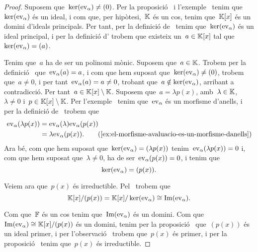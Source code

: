 \documentclass[../teoria-de-Galois.tex]{subfiles}
\begin{document}
    \begin{proof} %
        Suposem que~\(\operatorname{ker}(\mathrm{ev}_{\alpha})\neq(0)\).
        Per la proposició~ i l'exemple~ tenim que~\(\operatorname{ker}(\mathrm{ev}_{\alpha})\) és un ideal, i com que, per hipòtesi,~\(\mathbb{K}\) és un cos, tenim que~\(\mathbb{K}[x]\) és un domini d'ideals principals.
        Per tant, per la definició de~ tenim que~\(\operatorname{ker}(\mathrm{ev}_{\alpha})\) és un ideal principal, i per la definició d' trobem que existeix un~\(a\in\mathbb{K}[x]\) tal que~\(\operatorname{ker}(\mathrm{ev}_{\alpha})=(a)\).

        Tenim que~\(a\) ha de ser un polinomi mònic.
        Suposem que~\(a\in\mathbb{K}\).
        Trobem per la definició~ que~\(\mathrm{ev}_{\alpha}(a)=a\), i com que hem suposat que~\(\operatorname{ker}(\mathrm{ev}_{\alpha})\neq(0)\), trobem que~\(a\neq0\), i per tant~\(\mathrm{ev}_{\alpha}(a)=a\neq0\), trobant que~\(a\notin\operatorname{ker}(\mathrm{ev}_{\alpha})\), arribant a contradicció.
        Per tant~\(a\in\mathbb{K}[x]\setminus\mathbb{K}\).
        Suposem que~\(a=\lambda p(x)\), amb~\(\lambda\in\mathbb{K}\),~\(\lambda\neq0\) i~\(p\in\mathbb{K}[x]\setminus\mathbb{K}\).
        Per l'exemple~ tenim que~\(\mathrm{ev}_{\alpha}\) és un morfisme d'anells, i per la definició de~ trobem que
        \begin{align*}
            \ev_{\alpha}(\lambda p(x))&=\ev_{\alpha}(\lambda)\ev_{\alpha}(p(x))\\
            &=\lambda\ev_{\alpha}(p(x)).
            \tag{\ref{ex:el-morfisme-avaluacio-es-un-morfisme-danells}}
        \end{align*}
        Ara bé, com que hem suposat que~\(\operatorname{ker}(\mathrm{ev}_{\alpha})=(\lambda p(x))\) tenim~\(\mathrm{ev}_{\alpha}(\lambda p(x))=0\) i, com que hem suposat que~\(\lambda\neq0\), ha de ser~\(\mathrm{ev}_{\alpha}(p(x))=0\), i tenim que
        \[
            \operatorname{ker}(\mathrm{ev}_{\alpha})=(p(x)).
        \]

        Veiem ara que~\(p(x)\) és irreductible.
        Pel~ trobem que
        \[
            \mathbb{K}[x]/(p(x))=\mathbb{K}[x]/\operatorname{ker}(\mathrm{ev}_{\alpha})\cong\operatorname{Im}(\mathrm{ev}_{\alpha}).
        \]

        Com que~\(\mathbb{F}\) és un cos tenim que~\(\operatorname{Im}(\mathrm{ev}_{\alpha})\) és un domini.
        Com que~\(\operatorname{Im}(\mathrm{ev}_{\alpha})\cong\mathbb{K}[x]/(p(x))\) és un domini, tenim per la proposició~ que~\((p(x))\) és un ideal primer, i per l'observació~ trobem que~\(p(x)\) és primer, i per la proposició~ tenim que~\(p(x)\) és irreductible.
    \end{proof}
\end{document}
